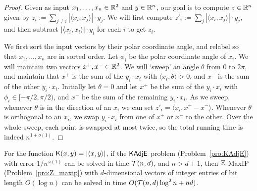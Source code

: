 \begin{proof}
Given as input $x_1, \ldots, x_n \in {\mathbb R}^2$ and $y \in {\mathbb R}^n$, our goal is to compute $z \in {\mathbb R}^n$ given by $z_i := \sum_{j\neq i} |\langle x_i, x_j\rangle| \cdot y_j$. We will first compute $z'_i := \sum_{j} |\langle x_i, x_j\rangle| \cdot y_j$, and then subtract $|\langle x_i, x_i\rangle| \cdot y_i$ for each $i$ to get $z_i$.

We first sort the input vectors by their polar coordinate angle, and relabel so that $x_1, \ldots, x_n$ are in sorted order. Let $\phi_i$ be the polar coordinate angle of $x_i$. We will maintain two vectors $x^+, x^- \in {\mathbb R}^2$.  We will `sweep' an angle $\theta$ from $0$ to $2\pi$, and maintain that $x^+$ is the sum of the $y_i \cdot x_i$ with $\langle x_i, \theta \rangle > 0$, and $x^-$ is the sum of the other $y_i \cdot x_i$. Initially let $\theta = 0$ and let $x^+$ be the sum of the $y_i \cdot x_i$ with $\phi_i \in [-\pi/2,\pi/2)$, and $x^-$ be the sum of the remaining $y_i \cdot x_i$. As we sweep, whenever $\theta$ is in the direction of an $x_i$ we can set $z'_i = \langle x_i, x^+ - x^-\rangle$. Whenever $\theta$ is orthogonal to an $x_i$, we swap $y_i \cdot x_i$ from one of $x^+$ or $x^-$ to the other. Over the whole sweep, each point is swapped at most twice, so the total running time is indeed $n^{1 + o(1)}$.
\end{proof}

\begin{lemma} \label{lem:solvemaxip}
For the function $\mathsf{K}(x,y) = |\langle x , y \rangle|$, if the $\mathsf{KAdjE}$ problem (Problem~\ref{pro:KAdjE}) with error $1/n^{\omega(1)}$ can be solved in time $\mathcal{T}(n,d)$, and $n>d+1$, then ${\mathbb Z}$-{\sf MaxIP} (Problem~\ref{pro:Z_maxip}) with $d$-dimensional vectors of integer entries of bit length $O(\log n)$ can be solved in time $O(\mathcal{T}(n,d) \log^2 n + nd)$.
\end{lemma}

